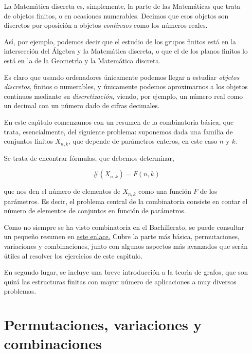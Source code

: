 

La Matem\'atica discreta es, simplemente, la parte de las Matem\'aticas que 
trata de objetos finitos, o en ocasiones  numerables. Decimos que esos objetos 
son discretos por oposici\'on a objetos {\itshape continuos} como los n\'umeros 
reales. 

As\'{\i}, por ejemplo, podemos decir que el estudio de los grupos finitos 
est\'a en la intersecci\'on del \'Algebra y la Matem\'atica discreta, o que el  
de los planos finitos lo est\'a  en la de la Geometr\'{\i}a y la Matem\'atica 
discreta.

Es claro que usando ordenadores \'unicamente podemos llegar a estudiar 
{\itshape objetos discretos}, finitos o numerables, y \'unicamente podemos 
aproximarnos a los objetos continuos mediante su {\itshape discretizaci\'on}, 
viendo, por ejemplo, un n\'umero real como un decimal con un n\'umero dado de 
cifras decimales.


En este cap\'{\i}tulo comenzamos con un resumen de la combinatoria b\'asica, 
que trata, esencialmente,  del siguiente problema:  suponemos dada
una familia de conjuntos finitos $X_{n,k}$, que depende de par\'ametros enteros,
en este caso $n$ y $k$. 

Se trata de encontrar f\'ormulas, que debemos determinar, 

\[\#(X_{n,k})=F(n,k)\]

\noindent que nos den el n\'umero de elementos de $X_{n,k}$ como una funci\'on
$F$ de los par\'ametros. Es decir, el problema central de la combinatoria
consiste en contar el n\'umero de elementos de conjuntos en funci\'on de
par\'ametros. 

Como no siempre se ha visto combinatoria en el Bachillerato, se puede consultar
un peque\~no resumen en 
\href{http://150.244.21.37/PDFs/MDISC/combinatoria.pdf}{este enlace.}  Cubre la parte m\'as
b\'asica, permutaciones, variaciones y combinaciones, junto con algunos
aspectos m\'as avanzados que ser\'an \'utiles al resolver los ejercicios de este
cap\'{\i}tulo.

En segundo lugar, se incluye una breve introducci\'on a la teor\'{\i}a de 
grafos, que son quiz\'a las estructuras finitas  con mayor n\'umero de 
aplicaciones a muy diversos problemas.

\section{Permutaciones, variaciones y combinaciones}

